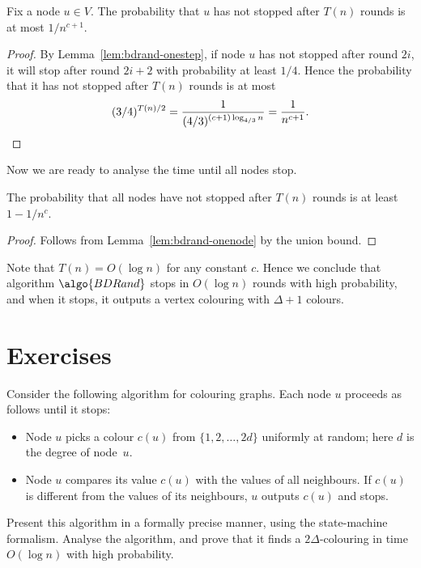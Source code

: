 \begin{lemma}\label{lem:bdrand-onenode}
    Fix a node $u \in V$. The probability that $u$ has not stopped after $T(n)$ rounds is at most $1/n^{c+1}$.
\end{lemma}
\begin{proof}
    By Lemma~\ref{lem:bdrand-onestep}, if node $u$ has not stopped after round $2i$, it will stop after round $2i+2$ with probability at least $1/4$. Hence the probability that it has not stopped after $T(n)$ rounds is at most
    \[
        (3/4)^{T(n)/2} = \frac{1}{(4/3)^{(c+1) \log_{4/3} n}} = \frac{1}{n^{c+1}}. \qedhere
    \]
\end{proof}

Now we are ready to analyse the time until all nodes stop.

\begin{theorem}\label{thm:bdrand}
    The probability that all nodes have not stopped after $T(n)$ rounds is at least $1 - 1/n^c$.
\end{theorem}
\begin{proof}
    Follows from Lemma~\ref{lem:bdrand-onenode} by the union bound.
\end{proof}

Note that $T(n) = O(\log n)$ for any constant $c$. Hence we conclude that algorithm $\algo{BDRand}$ stops in $O(\log n)$ rounds with high probability, and when it stops, it outputs a vertex colouring with $\Delta+1$ colours.


\section{Exercises}

\begin{ex}\label{ex:bdrand2delta}
    Consider the following algorithm for colouring graphs. Each node $u$ proceeds as follows until it stops:
    \begin{itemize}
        \item Node $u$ picks a colour $c(u)$ from $\{1,2,\dotsc,2d\}$ uniformly at random; here $d$ is the degree of node~$u$.
        \item Node $u$ compares its value $c(u)$ with the values of all neighbours. If $c(u)$ is different from the values of its neighbours, $u$ outputs $c(u)$ and stops.
    \end{itemize}
    Present this algorithm in a formally precise manner, using the state-machine formalism. Analyse the algorithm, and prove that it finds a $2\Delta$-colouring in time $O(\log n)$ with high probability.
\end{ex}

